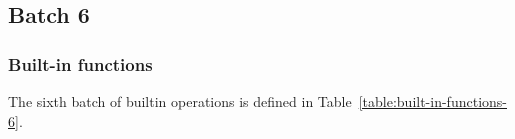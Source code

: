 \renewcommand{\note}[1]{
  \bigskip
  \refstepcounter{notenumberF}
  \noindent\textbf{Note \thenotenumberF. #1}
}
\newpage
\subsection{Batch 6}
\label{sec:default-builtins-6}

\subsubsection{Built-in functions}
\label{sec:built-in-functions-6}
The sixth batch of builtin operations is defined in Table~\ref{table:built-in-functions-6}.

